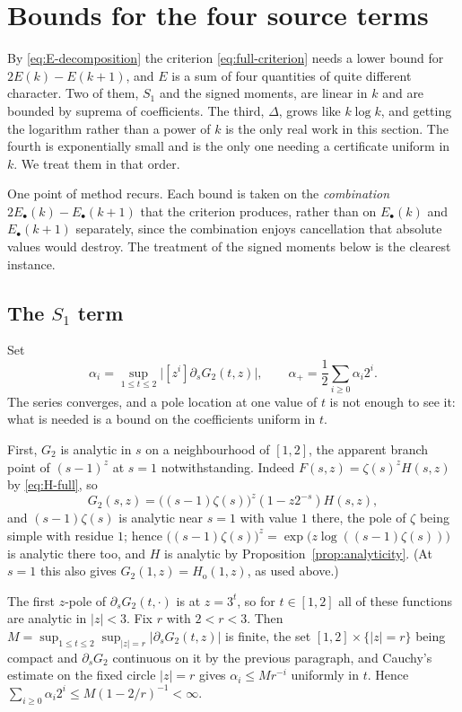 \documentclass[11pt]{amsart}
\theoremstyle{plain}
\theoremstyle{definition}
\newcommand{\abs}[1]{\lvert #1\rvert}
\begin{document}
\section{Bounds for the four source terms}\label{sec:sources}

By \eqref{eq:E-decomposition} the criterion \eqref{eq:full-criterion} needs a
lower bound for $2E(k)-E(k+1)$, and $E$ is a sum of four quantities of quite
different character. Two of them, $S_1$ and the signed moments, are linear in
$k$ and are bounded by suprema of coefficients. The third, $\Delta$, grows
like $k\log k$, and getting the logarithm rather than a power of $k$ is the
only real work in this section. The fourth is exponentially small and is the
only one needing a certificate uniform in $k$. We treat them in that order.

One point of method recurs. Each bound is taken on the \emph{combination}
$2E_\bullet(k)-E_\bullet(k+1)$ that the criterion produces, rather than on
$E_\bullet(k)$ and $E_\bullet(k+1)$ separately, since the combination enjoys
cancellation that absolute values would destroy. The treatment of the signed
moments below is the clearest instance.

\subsection{The $S_1$ term}

Set
\[
 \alpha_i=\sup_{1\leq t\leq2}\abs{[z^i]\partial_sG_2(t,z)},
 \qquad
 \alpha_+=\frac12\sum_{i\geq0}\alpha_i2^i.
\]
The series converges, and a pole location at one value of $t$ is not enough to
see it: what is needed is a bound on the coefficients uniform in $t$.

First, $G_2$ is analytic in $s$ on a neighbourhood of $[1,2]$, the apparent
branch point of $(s-1)^z$ at $s=1$ notwithstanding. Indeed
$F(s,z)=\zeta(s)^zH(s,z)$ by \eqref{eq:H-full}, so
\[
 G_2(s,z)=\bigl((s-1)\zeta(s)\bigr)^z(1-z2^{-s})H(s,z),
\]
and $(s-1)\zeta(s)$ is analytic near $s=1$ with value $1$ there, the pole of
$\zeta$ being simple with residue $1$; hence $\bigl((s-1)\zeta(s)\bigr)^z
=\exp\bigl(z\log((s-1)\zeta(s))\bigr)$ is analytic there too, and $H$ is
analytic by Proposition~\ref{prop:analyticity}. (At $s=1$ this also gives
$G_2(1,z)=H_{\mathrm o}(1,z)$, as used above.)

The first $z$-pole of $\partial_sG_2(t,\cdot)$ is at $z=3^t$, so for
$t\in[1,2]$ all of these functions are analytic in $\abs z<3$. Fix $r$ with
$2<r<3$. Then $M=\sup_{1\leq t\leq2}\sup_{\abs z=r}
\abs{\partial_sG_2(t,z)}$ is finite, the set $[1,2]\times\{\abs z=r\}$ being
compact and $\partial_sG_2$ continuous on it by the previous paragraph, and
Cauchy's estimate on the fixed circle $\abs z=r$ gives $\alpha_i\leq Mr^{-i}$
uniformly in $t$. Hence
$\sum_{i\geq0}\alpha_i2^i\leq M(1-2/r)^{-1}<\infty$.
\end{document}
